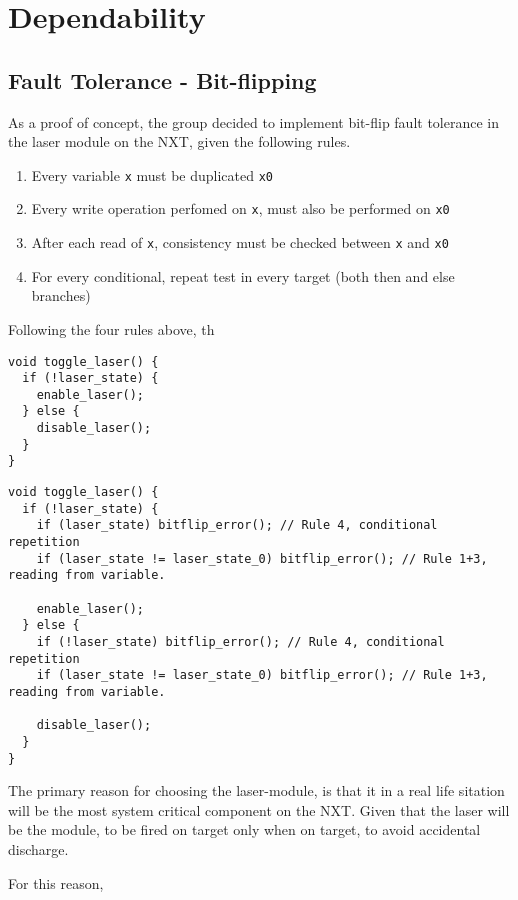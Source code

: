 \section{Dependability}\label{Design:Dependability}

\subsection{Fault Tolerance - Bit-flipping}
As a proof of concept, the group decided to implement bit-flip fault tolerance in the laser module on the NXT, given the following rules.

\begin{enumerate}
  \item Every variable \texttt{x} must be duplicated \texttt{x0} \cite{errorDetectionSoft}
  \item Every write operation perfomed on \texttt{x}, must also be performed on \texttt{x0} \cite{errorDetectionSoft}
  \item After each read of \texttt{x}, consistency must be checked between \texttt{x} and \texttt{x0} \cite{errorDetectionSoft}
  \item For every conditional, repeat test in every target (both then and else branches) \cite{errorDetectionSoft}
\end{enumerate}

Following the four rules above, th

\noindent\begin{minipage}{.45\textwidth}
\begin{lstlisting}[caption={Without bitflip-security},frame=tlrb,numbers=none]
void toggle_laser() {
  if (!laser_state) {
    enable_laser();
  } else {
    disable_laser();
  }
}
\end{lstlisting}
\end{minipage}\hfill
\begin{minipage}{.45\textwidth}
\begin{lstlisting}[caption={With bitflip-security},frame=tlrb,numbers=none]
void toggle_laser() {
  if (!laser_state) {
    if (laser_state) bitflip_error(); // Rule 4, conditional repetition
    if (laser_state != laser_state_0) bitflip_error(); // Rule 1+3, reading from variable.

    enable_laser();
  } else {
    if (!laser_state) bitflip_error(); // Rule 4, conditional repetition
    if (laser_state != laser_state_0) bitflip_error(); // Rule 1+3, reading from variable.

    disable_laser();
  }
}
\end{lstlisting}
\end{minipage}

The primary reason for choosing the laser-module, is that it in a real life sitation will be the most system critical component on the NXT.
Given that the laser will be the module, to be fired on target only when on target, to avoid accidental discharge.

For this reason,
